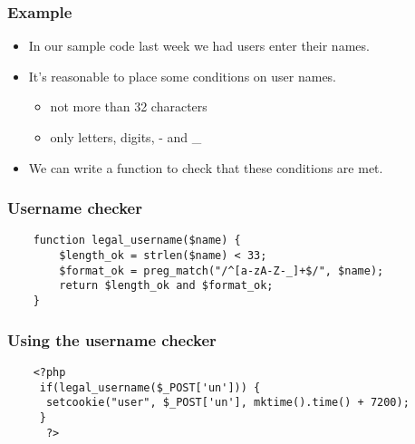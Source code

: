 \documentclass[10pt]{beamer}
\begin{document}
\begin{frame}
	\frametitle{Example}
	\begin{itemize}
		\item In our sample code last week we had users enter
			their names.
		\item It's reasonable to place some conditions on user names.
			\begin{itemize}
				\item not more than 32 characters
				\item only letters, digits, - and \_
			\end{itemize}
		\item We can write a function to check that these
			conditions are met.
	\end{itemize}
\end{frame}

\begin{frame}[fragile]
	\frametitle{Username checker}

	\begin{verbatim}
    function legal_username($name) {
        $length_ok = strlen($name) < 33;
        $format_ok = preg_match("/^[a-zA-Z-_]+$/", $name);
        return $length_ok and $format_ok;
    }
	\end{verbatim}
\end{frame}
\begin{frame}[fragile]
	\frametitle{Using the username checker}

	\begin{verbatim}
    <?php 
     if(legal_username($_POST['un'])) {
      setcookie("user", $_POST['un'], mktime().time() + 7200);
     }
      ?>

	\end{verbatim}
\end{frame}
\end{document}
